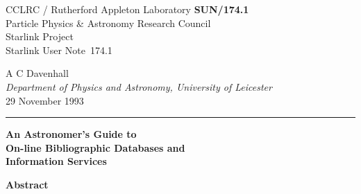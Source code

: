 \documentclass[twoside,11pt]{article}
\newcommand{\stardoccategory}  {Starlink User Note}
\newcommand{\stardocinitials}  {SUN}
\newcommand{\stardocnumber}    {174.1}
\newcommand{\stardocauthors}   {A C Davenhall \\
{\it Department of Physics and Astronomy, University of Leicester} }
\newcommand{\stardocdate}      {29 November 1993}
\newcommand{\stardoctitle}     {An Astronomer's Guide to\\[1ex]
On-line Bibliographic Databases and\\[1ex]
Information Services}
\newcommand{\stardocname}{\stardocinitials /\stardocnumber}
\newenvironment{latexonly}{}{}
\begin{document}
\thispagestyle{empty}

\begin{latexonly}
   CCLRC / {\sc Rutherford Appleton Laboratory} \hfill {\bf \stardocname}\\
   {\large Particle Physics \& Astronomy Research Council}\\
   {\large Starlink Project\\}
   {\large \stardoccategory\ \stardocnumber}
   \begin{flushright}
   \stardocauthors\\
   \stardocdate
   \end{flushright}
   \vspace{-4mm}
   \rule{\textwidth}{0.5mm}
   \vspace{5mm}
   \begin{center}
   {\Huge\bf  \stardoctitle}
   \end{center}
   \vspace{5mm}

   \vspace{10mm}
   \begin{center}
      {\Large\bf Abstract}
   \end{center}
\end{latexonly}
\end{document}
